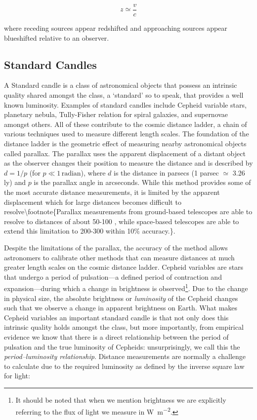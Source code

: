 \begin{equation}z \simeq \frac{v}{c}\label{eq:lowvelocity}\end{equation}

where receding sources appear redshifted and approaching sources appear
blueshifted relative to an observer.

\subsection{Standard Candles}\label{standard-candles}

A Standard candle is a class of astronomical objects that possess an
intrinsic quality shared amongst the class, a `standard' so to speak,
that provides a well known luminosity. Examples of standard candles
include Cepheid variable stars, planetary nebula, Tully-Fisher relation
for spiral galaxies, and supernovae amongst others. All of these
contribute to the cosmic distance ladder, a chain of various techniques
used to measure different length scales. The foundation of the distance
ladder is the geometric effect of measuring nearby astronomical objects
called parallax. The parallax uses the apparent displacement of a
distant object as the observer changes their position to measure the
distance and is described by \(d = 1 / p\) (for
\(p \ll 1\, \text{radian}\)), where \(d\) is the distance in parsecs (1
parsec \(\simeq\) 3.26 \si{ly}) and \(p\) is the parallax angle in
arcseconds. While this method provides some of the most accurate
distance measurements, it is limited by the apparent displacement which
for large distances becomes difficult to
resolve\textbackslash{}footnote\{Parallax measurements from ground-based
telescopes are able to resolve to distances of about 50-100
\si{\parsec}, while space-based telescopes are able to extend this
limitation to 200-300 \si{\parsec} within 10\% accuracy.\}.

Despite the limitations of the parallax, the accuracy of the method
allows astronomers to calibrate other methods that can measure distances
at much greater length scales on the cosmic distance ladder. Cepheid
variables are stars that undergo a period of pulsation---a defined
period of contraction and expansion---during which a change in
brightness is
observed\footnote{It should be noted that when we mention brightness we are explicitly referring to the flux of light we measure in \si{\W\per\metre\squared}.}.
Due to the change in physical size, the absolute brightness or
\emph{luminosity} of the Cepheid changes such that we observe a change
in apparent brightness on Earth. What makes Cepheid variables an
important standard candle is that not only does this intrinsic quality
holds amongst the class, but more importantly, from empirical evidence
we know that there is a direct relationship between the period of
pulsation and the true luminosity of Cepheids: unsurprisingly, we call
this the \emph{period--luminosity relationship}. Distance measurements
are normally a challenge to calculate due to the required luminosity as
defined by the inverse square law for light:

